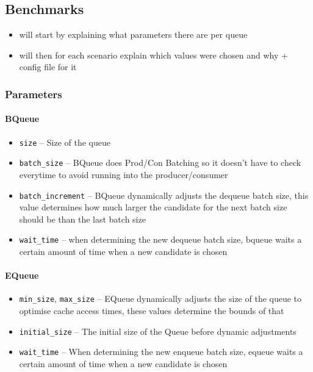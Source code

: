 \subsection{Benchmarks}
\begin{itemize}
    \item will start by explaining what parameters there are per queue
    \item will then for each scenario explain which values were chosen and why + config file for it
\end{itemize}

\subsubsection{Parameters}
\paragraph{BQueue}
\begin{itemize}
    \item \texttt{size} -- Size of the queue
    \item \texttt{batch\_size} -- BQueue does Prod/Con Batching so it doesn't have to check everytime to avoid
        running into the producer/consumer
    \item \texttt{batch\_increment} -- BQueue dynamically adjusts the dequeue batch size, this value
        determines how much larger the candidate for the next batch size should be than the last batch size
    \item \texttt{wait\_time} -- when determining the new dequeue batch size, bqueue waits a certain amount of
        time when a new candidate is chosen
\end{itemize}

\paragraph{EQueue}
\begin{itemize}
    \item \texttt{min\_size}, \texttt{max\_size} -- EQueue dynamically adjusts the size of the queue to
        optimise cache access times, these values determine the bounds of that
    \item \texttt{initial\_size} -- The initial size of the Queue before dynamic adjustments
    \item \texttt{wait\_time} -- When determining the new enqueue batch size, equeue waits a certain amount of
        time when a new candidate is chosen
\end{itemize}


